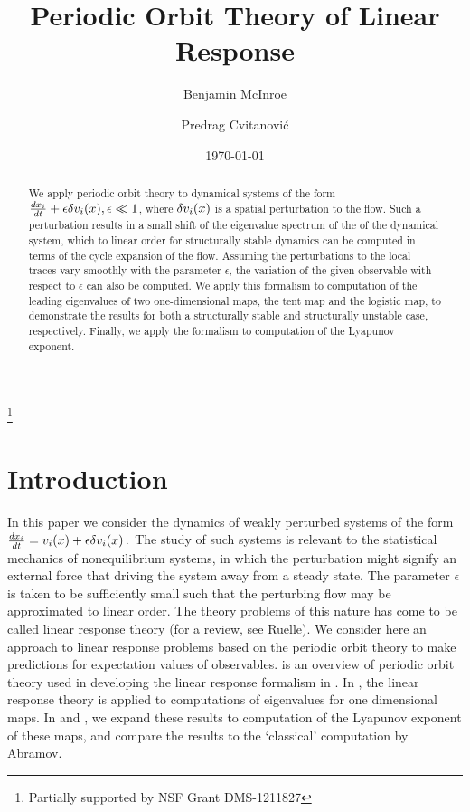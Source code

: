 \documentclass[aps,pre,
                showpacs,
                twocolumn,
                groupedaddress,
                superscriptaddress,
                floatfix]{revtex4-1}
\begin{document}
\title{Periodic Orbit Theory of Linear Response}
\author{Benjamin McInroe}
\author{Predrag Cvitanovi\'c}
\thanks{Partially supported by NSF Grant DMS-1211827}

\date{\today}

\begin{abstract}
We apply periodic orbit theory to dynamical systems of
the form $\frac{dx_{i}}{dt}+\epsilon \delta v_{i}(x), \epsilon \ll 1$,
where $\delta v_{i}(x)$ is a spatial perturbation to the flow. Such a
perturbation results in a small shift of the eigenvalue spectrum of the
{\evOper} of the dynamical system, which to linear order for
structurally stable dynamics can be computed in terms of the cycle
expansion of the flow. Assuming the perturbations to the local traces
vary smoothly with the parameter $\epsilon$, the variation of the
 given observable with respect to $\epsilon$ can
also be computed. We apply this formalism to computation of the leading
eigenvalues of two one-dimensional maps, the tent map and the logistic
map, to demonstrate the results for both a structurally stable and
structurally unstable case, respectively. Finally, we apply the formalism
to computation of the Lyapunov exponent.
\end{abstract}

\maketitle



\section{Introduction}
\label{sect:intro}

In this paper we consider the dynamics of weakly perturbed systems of
the form
\(
\frac{dx_{i}}{dt}=v_{i}(x) + \epsilon \delta v_{i}(x)
\,.
\) %
The study of such systems is relevant to the statistical mechanics of
nonequilibrium systems, in which the perturbation might signify an
external force that driving the system away from a steady state. The
parameter $\epsilon$ is taken to be sufficiently small such that the
perturbing flow may be approximated to linear order. The
theory problems of this nature has come to be
called linear response theory (for a review, see Ruelle).
We consider here an
approach to linear response problems based on the periodic
orbit theory to make predictions for expectation values of
observables.   is an overview of periodic orbit
theory used in developing the linear response formalism in
. In , the linear response
theory is applied to computations of eigenvalues for one dimensional
maps. In  and , we expand these
results to computation of the Lyapunov exponent of these maps, and
compare the results to the `classical' computation by
Abramov.
\end{document}
